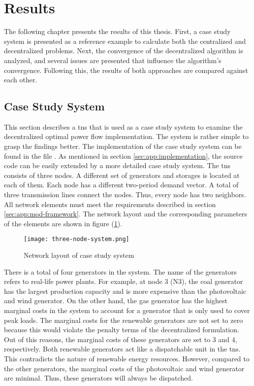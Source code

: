 \section{Results}
\label{sec:res}

The following chapter presents the results of this thesis. First, a case study system is presented as a reference example to calculate both the centralized and decentralized problems. Next, the convergence of the decentralized algorithm is analyzed, and several issues are presented that influence the algorithm's convergence. Following this, the results of both approaches are compared against each other.

\subsection{Case Study System}
\label{sec:res:tns}

This section describes a \gls{tns} that is used as a case study system to examine the decentralized optimal power flow implementation. The system is rather simple to grasp the findings better. The implementation of the case study system can be found in the file . As mentioned in section \ref{sec:app:implementation}, the source code can be easily extended by a more detailed case study system. The \gls{tns} consists of three nodes. A different set of generators and storages is located at each of them. Each node has a different two-period demand vector. A total of three transmission lines connect the nodes. Thus, every node has two neighbors. All network elements must meet the requirements described in section \ref{sec:app:mod-framework}. The network layout and the corresponding parameters of the elements are shown in figure (\ref{fig:tns}).

\begin{figure}[h]
	\centering
	\texttt{[image: three-node-system.png]}
	\caption{Network layout of case study system}
	\label{fig:tns}
\end{figure}

There is a total of four generators in the system. The name of the generators refers to real-life power plants. For example, at node 3 (N3), the coal generator has the largest production capacity and is more expensive than the photovoltaic and wind generator. On the other hand, the gas generator has the highest marginal costs in the system to account for a generator that is only used to cover peak loads. The marginal costs for the renewable generators are not set to zero because this would violate the penalty terms of the decentralized formulation. Out of this reasons, the marginal costs of these generators are set to 3 and 4, respectively. Both renewable generators act like a dispatchable unit in the \gls{tns}. This contradicts the nature of renewable energy resources. However, compared to the other generators, the marginal costs of the photovoltaic and wind generator are minimal. Thus, these generators will always be dispatched.

